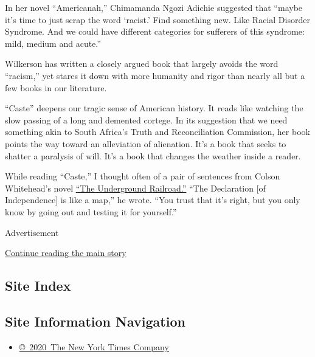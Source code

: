 In her novel ``Americanah,'' Chimamanda Ngozi Adichie suggested that
``maybe it's time to just scrap the word `racist.' Find something new.
Like Racial Disorder Syndrome. And we could have different categories
for sufferers of this syndrome: mild, medium and acute.''

Wilkerson has written a closely argued book that largely avoids the word
``racism,'' yet stares it down with more humanity and rigor than nearly
all but a few books in our literature.

``Caste'' deepens our tragic sense of American history. It reads like
watching the slow passing of a long and demented cortege. In its
suggestion that we need something akin to South Africa's Truth and
Reconciliation Commission, her book points the way toward an alleviation
of alienation. It's a book that seeks to shatter a paralysis of will.
It's a book that changes the weather inside a reader.

While reading ``Caste,'' I thought often of a pair of sentences from
Colson Whitehead's novel
\href{https://www.nytimes.com/2016/08/03/books/review-the-underground-railroad-colson-whitehead.html}{``The
Underground Railroad.''} ``The Declaration {[}of Independence{]} is like
a map,'' he wrote. ``You trust that it's right, but you only know by
going out and testing it for yourself.''

Advertisement

\protect\hyperlink{after-bottom}{Continue reading the main story}

\hypertarget{site-index}{%
\subsection{Site Index}\label{site-index}}

\hypertarget{site-information-navigation}{%
\subsection{Site Information
Navigation}\label{site-information-navigation}}

\begin{itemize}
\tightlist
\item
  \href{https://help.nytimes.com/hc/en-us/articles/115014792127-Copyright-notice}{©~2020~The
  New York Times Company}
\end{itemize}

